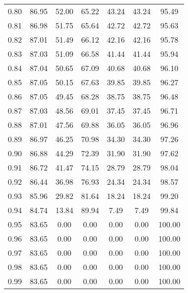 \begin{tabular}{|c|c|c|c|c|c|c|}
      0.80 &     86.95 &     52.00 &      65.22 &   43.24 &      43.24 &         95.49 \\
      0.81 &     86.98 &     51.75 &      65.64 &   42.72 &      42.72 &         95.63 \\
      0.82 &     87.01 &     51.49 &      66.12 &   42.16 &      42.16 &         95.78 \\
      0.83 &     87.03 &     51.09 &      66.58 &   41.44 &      41.44 &         95.94 \\
      0.84 &     87.04 &     50.65 &      67.09 &   40.68 &      40.68 &         96.10 \\
      0.85 &     87.05 &     50.15 &      67.63 &   39.85 &      39.85 &         96.27 \\
      0.86 &     87.05 &     49.45 &      68.28 &   38.75 &      38.75 &         96.48 \\
      0.87 &     87.03 &     48.56 &      69.01 &   37.45 &      37.45 &         96.71 \\
      0.88 &     87.01 &     47.56 &      69.88 &   36.05 &      36.05 &         96.96 \\
      0.89 &     86.97 &     46.25 &      70.98 &   34.30 &      34.30 &         97.26 \\
      0.90 &     86.88 &     44.29 &      72.39 &   31.90 &      31.90 &         97.62 \\
      0.91 &     86.72 &     41.47 &      74.15 &   28.79 &      28.79 &         98.04 \\
      0.92 &     86.44 &     36.98 &      76.93 &   24.34 &      24.34 &         98.57 \\
      0.93 &     85.96 &     29.82 &      81.64 &   18.24 &      18.24 &         99.20 \\
      0.94 &     84.74 &     13.84 &      89.94 &    7.49 &       7.49 &         99.84 \\
      0.95 &     83.65 &      0.00 &       0.00 &    0.00 &       0.00 &        100.00 \\
      0.96 &     83.65 &      0.00 &       0.00 &    0.00 &       0.00 &        100.00 \\
      0.97 &     83.65 &      0.00 &       0.00 &    0.00 &       0.00 &        100.00 \\
      0.98 &     83.65 &      0.00 &       0.00 &    0.00 &       0.00 &        100.00 \\
      0.99 &     83.65 &      0.00 &       0.00 &    0.00 &       0.00 &        100.00 \\
\bottomrule
\end{tabular}
